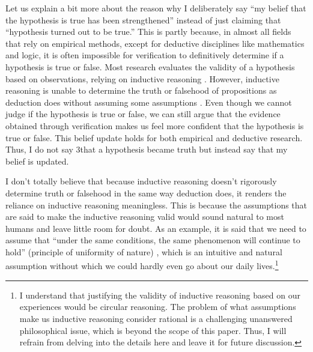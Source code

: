 
Let us explain a bit more about the reason why I deliberately say ``my belief that the hypothesis is true has been strengthened'' instead of just claiming that ``hypothesis turned out to be true.'' This is partly because, in almost all fields that rely on empirical methods, except for deductive disciplines like mathematics and logic, it is often impossible for verification to definitively determine if a hypothesis is true or false. Most research evaluates the validity of a hypothesis based on observations, relying on inductive reasoning \cite{sep-scientific-method}. However, inductive reasoning is unable to determine the truth or falsehood of propositions as deduction does without assuming some assumptions \cite{sep-induction-problem}. Even though we cannot judge if the hypothesis is true or false, we can still argue that the evidence obtained through verification makes us feel more confident that the hypothesis is true or false. This belief update holds for both empirical and deductive research. Thus, I do not say 3that a hypothesis became truth but instead say that my belief is updated.

I don't totally believe that because inductive reasoning doesn't rigorously determine truth or falsehood in the same way deduction does, it renders the reliance on inductive reasoning meaningless. This is because the assumptions that are said to make the inductive reasoning valid would sound natural to most humans and leave little room for doubt. As an example, it is said that we need to assume that ``under the same conditions, the same phenomenon will continue to hold'' (principle of uniformity of nature) \cite{sep-induction-problem}, which is an intuitive and natural assumption without which we could hardly even go about our daily lives.\footnote{
I understand that justifying the validity of inductive reasoning based on our experiences would be circular reasoning. The problem of what assumptions make us inductive reasoning consider rational is a challenging unanswered philosophical issue, which is beyond the scope of this paper. Thus, I will refrain from delving into the details here and leave it for future discussion.
} 

